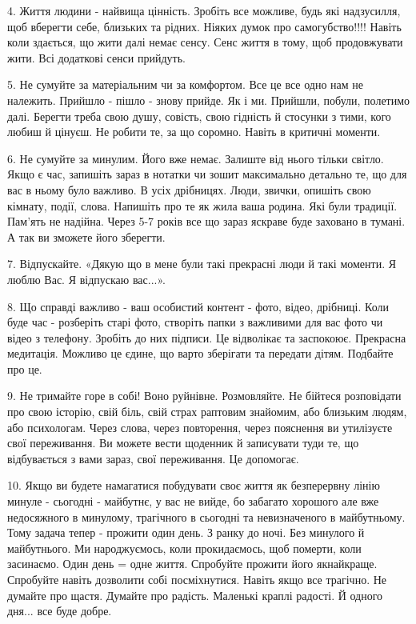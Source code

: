 4. Життя людини - найвища цінність. Зробіть все можливе, будь які надзусилля,
щоб вберегти себе, близьких та рідних. Ніяких думок про самогубство!!!! Навіть
коли здається, що жити далі немає сенсу. Сенс життя в тому, щоб продовжувати
жити. Всі додаткові сенси прийдуть. 

5. Не сумуйте за матеріальним чи за комфортом. Все це все одно нам не належить.
Прийшло - пішло - знову прийде. Як і ми. Прийшли, побули, полетимо далі.
Берегти треба свою душу, совість, свою гідність й стосунки з тими, кого любиш й
цінуєш. Не робити те, за що соромно. Навіть в критичні моменти. 

6. Не сумуйте за минулим. Його вже немає.  Залиште від нього тільки світло.
Якщо є час,  запишіть зараз в нотатки чи зошит максимально детально те, що для
вас в ньому було важливо. В усіх дрібницях. Люди, звички, опишіть свою кімнату,
події, слова. Напишіть про те як жила ваша родина. Які були традиції. Пам’ять
не надійна. Через 5-7 років все що зараз яскраве буде заховано в тумані. А так
ви зможете його зберегти. 

7. Відпускайте. «Дякую що в мене були такі прекрасні люди й такі моменти. Я
люблю Вас. Я відпускаю вас...». 

8. Що справді важливо - ваш особистий контент - фото, відео, дрібниці. Коли
буде час - розберіть старі фото, створіть папки з важливими для вас фото чи
відео з телефону. Зробіть до них підписи. Це відволікає та заспокоює. Прекрасна
медитація. Можливо це єдине, що варто зберігати та передати дітям. Подбайте про
це. 

9. Не тримайте горе в собі! Воно руйнівне. Розмовляйте. Не бійтеся розповідати
про свою історію, свій  біль, свій страх раптовим знайомим, або близьким людям,
або психологам. Через слова, через повторення, через пояснення ви утилізуєте
свої переживання. Ви можете вести щоденник й записувати туди те, що
відбувається з вами зараз, свої переживання. Це допомогає. 

10. Якщо ви будете намагатися побудувати своє життя як безперервну лінію минуле
- сьогодні - майбутнє, у вас не вийде, бо забагато хорошого але вже недосяжного
в минулому, трагічного в сьогодні та невизначеного в майбутньому. Тому задача
тепер - прожити один день. З ранку до ночі. Без минулого й майбутнього. Ми
народжуємось, коли прокидаємось, щоб померти, коли засинаємо. Один день = одне
життя. Спробуйте прожити його якнайкраще. Спробуйте навіть дозволити собі
посміхнутися. Навіть якщо все трагічно. Не думайте про щастя. Думайте про
радість. Маленькі краплі  радості. Й одного дня... все буде добре.

